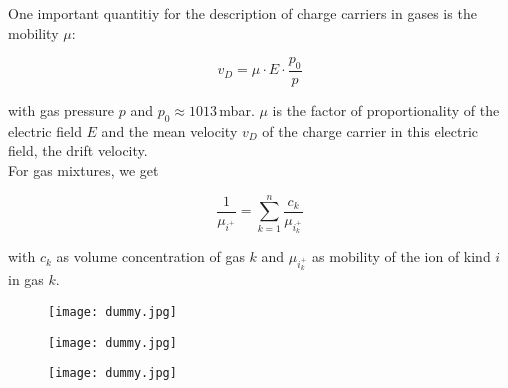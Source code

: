 One important quantitiy for the description of charge carriers in gases is the mobility $\mu$:

\[v_D = \mu\cdot E \cdot \frac{p_0}{p}  \]

with gas pressure $p$ and $p_0\approx 1013\,$mbar. $\mu$ is the factor of proportionality of the
electric field $E$ and the mean velocity $v_D$ of the charge carrier in this electric field, the
drift velocity.
\\
For gas mixtures, we get

\[\frac{1}{\mu_{i^+}} = \sum_{k=1}^n \frac{c_k}{\mu_{i^+_k}}  \]

with $c_k$ as volume concentration of gas $k$ and $\mu_{i^+_k}$ as mobility of the ion of kind $i$
in gas $k$.


\begin{figure}[H]
	\centering
	\texttt{[image: dummy.jpg]}
\end{figure}

\begin{figure}[H]
	\centering
	\texttt{[image: dummy.jpg]}
\end{figure}

\begin{figure}[H]
	\centering
	\texttt{[image: dummy.jpg]}
\end{figure}

